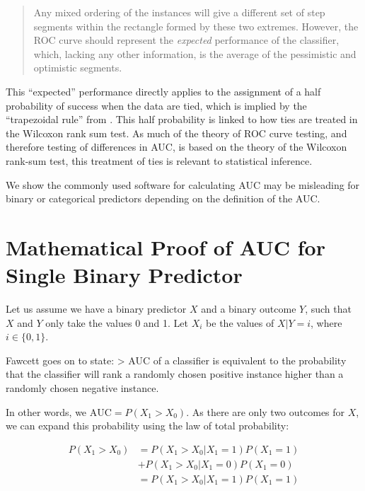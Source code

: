 \documentclass[article]{jss}
\begin{document}
\begin{quote}
Any mixed ordering of the instances will give a different set of step
segments within the rectangle formed by these two extremes. However, the
ROC curve should represent the \emph{expected} performance of the
classifier, which, lacking any other information, is the average of the
pessimistic and optimistic segments.
\end{quote}

This ``expected'' performance directly applies to the assignment of a
half probability of success when the data are tied, which is implied by
the ``trapezoidal rule'' from \citet{hanley1982meaning}. This half
probability is linked to how ties are treated in the Wilcoxon rank sum
test. As much of the theory of ROC curve testing, and therefore testing
of differences in AUC, is based on the theory of the Wilcoxon rank-sum
test, this treatment of ties is relevant to statistical inference.

We show the commonly used software for calculating AUC may be misleading
for binary or categorical predictors depending on the definition of the
AUC.

\hypertarget{mathematical-proof-of-auc-for-single-binary-predictor}{%
\section{Mathematical Proof of AUC for Single Binary
Predictor}\label{mathematical-proof-of-auc-for-single-binary-predictor}}

Let us assume we have a binary predictor \(X\) and a binary outcome
\(Y\), such that \(X\) and \(Y\) only take the values \(0\) and 1. Let
\(X_{i}\) be the values of \(X | Y = i\), where \(i \in \{0, 1\}\).

Fawcett goes on to state: \textgreater{} AUC of a classifier is
equivalent to the probability that the classifier will rank a randomly
chosen positive instance higher than a randomly chosen negative
instance.

In other words, we \(\text{AUC} = P(X_{1} > X_{0})\). As there are only
two outcomes for \(X\), we can expand this probability using the law of
total probability:

\begin{align}
P(X_{1} > X_{0}) &= P(X_{1} > X_{0} | X_{1} = 1) P(X_{1} = 1) \nonumber \\
&+ P(X_{1} > X_{0} | X_{1} = 0) P(X_{1} = 0) \label{eq:expand1} \\
&= P(X_{1} > X_{0} | X_{1} = 1) P(X_{1} = 1) \label{eq:expand}
\end{align}
\end{document}
